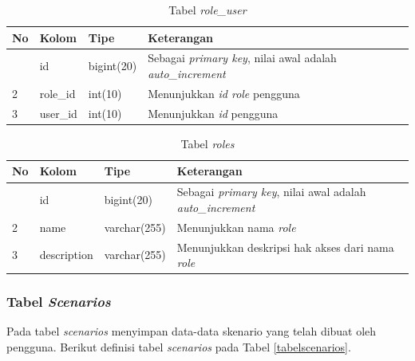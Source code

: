 				\begin{longtable}{|p{}|p{}|p{}|p{}|}
					\caption{Tabel \textit{role\_user}} \label{tabelroleuser} \\
					\hline
					\textbf{No} & \textbf{Kolom} & \textbf{Tipe} & \textbf{Keterangan} \\ \hline
					\endhead
					\endfoot
					\endlastfoot
					1 & id & bigint(20) & Sebagai \textit{primary key}, nilai awal adalah \textit{auto\_increment} \\ \hline
					2 & role\_id & int(10) & Menunjukkan \textit{id role} pengguna \\ \hline
					3 & user\_id & int(10) & Menunjukkan \textit{id} pengguna \\ \hline
				\end{longtable}
				
				\begin{longtable}{|p{}|p{}|p{}|p{}|}
					\caption{Tabel \textit{roles}} \label{tabelroles} \\
					\hline
					\textbf{No} & \textbf{Kolom} & \textbf{Tipe} & \textbf{Keterangan} \\ \hline
					\endhead
					\endfoot
					\endlastfoot
					1 & id & bigint(20) & Sebagai \textit{primary key}, nilai awal adalah \textit{auto\_increment} \\ \hline
					2 & name & varchar(255) & Menunjukkan nama \textit{role} \\ \hline
					3 & description & varchar(255) & Menunjukkan deskripsi hak akses dari nama \textit{role} \\ \hline
				\end{longtable}
		
			\subsubsection{Tabel \textit{Scenarios}}
				Pada tabel \textit{scenarios} menyimpan data-data skenario yang telah dibuat oleh pengguna. Berikut definisi tabel \textit{scenarios} pada Tabel \ref{tabelscenarios}.
			
